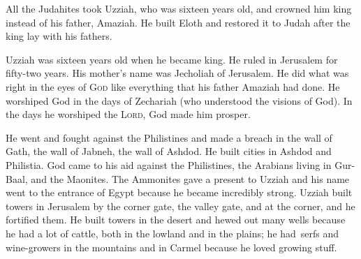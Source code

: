 
\begin{inparaenum}
     All the Judahites took Uzziah, who was sixteen years old, and crowned him king instead of his father, Amaziah.%
     He built Eloth and restored it to Judah after the king lay with his fathers.%
    
     Uzziah was sixteen years old when he became king. He ruled in Jerusalem for fifty-two years. His mother's name was Jecholiah of Jerusalem.%
     He did what was right in the eyes of \textsc{God} like everything that his father Amaziah had done.%
     He worshiped God in the days of Zechariah (who understood the visions of God). In the days he worshiped the \textsc{Lord}, God made him prosper.%
    
     He went and fought against the Philistines and made a breach in the wall of Gath, the wall of Jabneh, the wall of Ashdod. He built cities in Ashdod and Philistia.%
     God came to his aid against the Philistines, the Arabians living in Gur-Baal, and the Maonites.%
     The Ammonites gave a present to Uzziah and his name went to the entrance of Egypt because he became incredibly strong.%
     Uzziah built towers in Jerusalem by the corner gate, the valley gate, and at the corner, and he fortified them.%
     He built towers in the desert and hewed out many wells because he had a lot of cattle, both in the lowland and in the plains; he had\understood\ serfs and wine-growers in the mountains and in Carmel because he loved growing stuff.%
    

\end{inparaenum}
